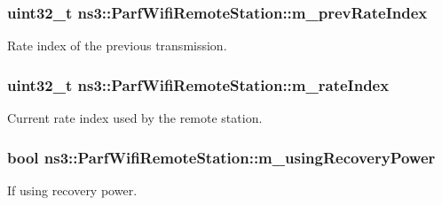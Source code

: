 \subsubsection[{\texorpdfstring{m\+\_\+prev\+Rate\+Index}{m_prevRateIndex}}]{\setlength{\rightskip}{0pt plus 5cm}uint32\+\_\+t ns3\+::\+Parf\+Wifi\+Remote\+Station\+::m\+\_\+prev\+Rate\+Index}\hypertarget{structns3_1_1ParfWifiRemoteStation_a6c09435a42ed3de8115ed6507bb3f5b3}{}\label{structns3_1_1ParfWifiRemoteStation_a6c09435a42ed3de8115ed6507bb3f5b3}


Rate index of the previous transmission. 

\subsubsection[{\texorpdfstring{m\+\_\+rate\+Index}{m_rateIndex}}]{\setlength{\rightskip}{0pt plus 5cm}uint32\+\_\+t ns3\+::\+Parf\+Wifi\+Remote\+Station\+::m\+\_\+rate\+Index}\hypertarget{structns3_1_1ParfWifiRemoteStation_a4954413c2b8ad350908d1b31fde1ecfa}{}\label{structns3_1_1ParfWifiRemoteStation_a4954413c2b8ad350908d1b31fde1ecfa}


Current rate index used by the remote station. 

\subsubsection[{\texorpdfstring{m\+\_\+using\+Recovery\+Power}{m_usingRecoveryPower}}]{\setlength{\rightskip}{0pt plus 5cm}bool ns3\+::\+Parf\+Wifi\+Remote\+Station\+::m\+\_\+using\+Recovery\+Power}\hypertarget{structns3_1_1ParfWifiRemoteStation_a18a3f40f7be071793846886996ee6a4c}{}\label{structns3_1_1ParfWifiRemoteStation_a18a3f40f7be071793846886996ee6a4c}


If using recovery power. 

